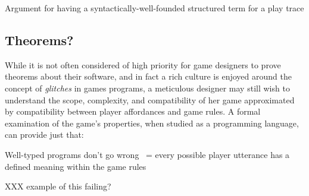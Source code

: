   Argument for having a syntactically-well-founded structured term for a
  play trace

  \subsection{Theorems?}

  While it is not often considered of high priority for game designers to
  prove theorems about their software, and in fact a rich culture is
  enjoyed around the concept of {\em glitches} in games programs, a
  meticulous designer may still wish to understand the scope, complexity,
  and compatibility of her game approximated by compatibility between 
  player affordances and game rules. A formal examination of the game's
  properties, when studied as a programming language, can provide just
  that:

  Well-typed programs don't go wrong ~= every possible player utterance has
  a defined meaning within the game rules

  XXX example of this failing?


